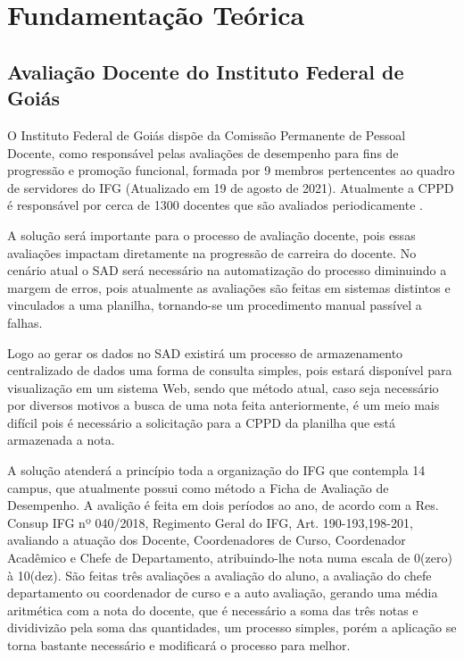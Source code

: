 \chapter{Fundamentação Teórica}

  
\section{Avaliação Docente do Instituto Federal de Goiás}
    O Instituto Federal de Goiás dispõe da Comissão Permanente de Pessoal Docente, como responsável pelas avaliações de desempenho para fins de progressão e promoção funcional, formada por 9 membros pertencentes ao quadro de servidores do IFG (Atualizado em 19 de agosto de 2021). Atualmente a CPPD é responsável por cerca de 1300 docentes que são avaliados periodicamente \cite{ifg}.
    
    A solução será importante para o processo de avaliação docente, pois essas avaliações impactam diretamente na progressão de carreira do docente. No cenário atual o SAD será necessário na automatização do processo diminuindo a margem de erros, pois atualmente as avaliações são feitas em sistemas distintos e vinculados a uma planilha, tornando-se um procedimento manual passível a falhas. 
    
    Logo ao gerar os dados no SAD existirá um processo de armazenamento centralizado de dados uma forma de consulta simples, pois estará disponível para visualização em um sistema Web, sendo que método atual, caso seja necessário por diversos motivos a busca de uma nota feita anteriormente, é um meio mais difícil pois é necessário a solicitação para a CPPD da planilha que está armazenada a nota.
    
    A solução atenderá a princípio toda a organização do IFG que contempla 14 campus, que atualmente possui como método a Ficha de Avaliação de Desempenho. A avalição é feita em dois períodos ao ano, de acordo com a Res. Consup IFG nº 040/2018, Regimento Geral do IFG, Art. 190-193,198-201, avaliando a atuação dos Docente, Coordenadores de Curso, Coordenador Acadêmico e Chefe de Departamento, atribuindo-lhe nota numa escala de 0(zero) à 10(dez). São feitas três avaliações a avaliação do aluno, a avaliação do chefe departamento ou coordenador de curso e a auto avaliação, gerando uma média aritmética com a nota do docente, que é necessário a soma das três notas e dividivizão pela soma das quantidades, um processo simples, porém a aplicação se torna bastante necessário e modificará o processo para melhor.


